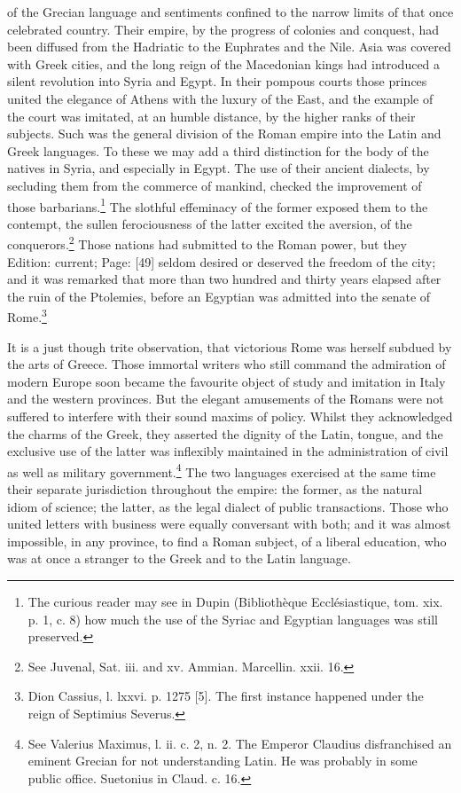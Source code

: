 of the Grecian language and sentiments confined to the narrow limits of that once celebrated country. Their empire, by the progress of colonies and conquest, had been diffused from the Hadriatic to the Euphrates and the Nile. Asia was covered with Greek cities, and the long reign of the Macedonian kings had introduced a silent revolution into Syria and Egypt. In their pompous courts those princes united the elegance of Athens with the luxury of the East, and the example of the court was imitated, at an humble distance, by the higher ranks of their subjects. Such was the general division of the Roman empire into the Latin and Greek languages. To these we may add a third distinction for the body of the natives in Syria, and especially in Egypt. The use of their ancient dialects, by secluding them from the commerce of mankind, checked the improvement of those barbarians.\footnote{The curious reader may see in Dupin (Bibliothèque Ecclésiastique, tom. xix. p. 1, c. 8) how much the use of the Syriac and Egyptian languages was still preserved.} The slothful effeminacy of the former exposed them to the contempt, the sullen ferociousness of the latter excited the aversion, of the conquerors.\footnote{See Juvenal, Sat. iii. and xv. Ammian. Marcellin. xxii. 16.} Those nations had submitted to the Roman power, but they Edition: current; Page: [49] seldom desired or deserved the freedom of the city; and it was remarked that more than two hundred and thirty years elapsed after the ruin of the Ptolemies, before an Egyptian was admitted into the senate of Rome.\footnote{Dion Cassius, l. lxxvi. p. 1275 [5]. The first instance happened under the reign of Septimius Severus.}

It is a just though trite observation, that victorious Rome was herself subdued by the arts of Greece. Those immortal writers who still command the admiration of modern Europe soon became the favourite object of study and imitation in Italy and the western provinces. But the elegant amusements of the Romans were not suffered to interfere with their sound maxims of policy. Whilst they acknowledged the charms of the Greek, they asserted the dignity of the Latin, tongue, and the exclusive use of the latter was inflexibly maintained in the administration of civil as well as military government.\footnote{See Valerius Maximus, l. ii. c. 2, n. 2. The Emperor Claudius disfranchised an eminent Grecian for not understanding Latin. He was probably in some public office. Suetonius in Claud. c. 16.} The two languages exercised at the same time their separate jurisdiction throughout the empire: the former, as the natural idiom of science; the latter, as the legal dialect of public transactions. Those who united letters with business were equally conversant with both; and it was almost impossible, in any province, to find a Roman subject, of a liberal education, who was at once a stranger to the Greek and to the Latin language.

